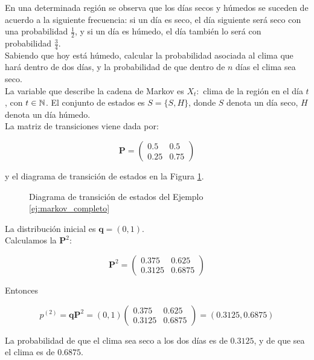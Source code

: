 \begin{ejemplo} \label{ej:markov_completo}

En una determinada región se observa que los días secos y húmedos se suceden de acuerdo a la siguiente frecuencia: si un día es seco, el día siguiente será seco con una probabilidad $\frac{1}{2}$, y si un día es húmedo, el día también lo será con probabilidad $\frac{3}{4}$.\\

Sabiendo que hoy está húmedo, calcular la probabilidad asociada al clima que hará dentro de dos días, y la probabilidad de que dentro de $n$ días el clima sea seco. \\

La variable que describe la cadena de Markov es $X_t:$ clima de la región en el día $t$, con $t \in \mathbb{N}$. El conjunto de estados es $S = \{S, H\}$, donde $S$ denota un día seco, $H$ denota un día húmedo.\\

La matriz de transiciones viene dada por:

\[ \mathbf{P} = \left( \begin{array}{cc}
0.5 & 0.5\\
0.25 & 0.75
\end{array} \right) \]

y el diagrama de transición de estados en la Figura \ref{fig:markov_completo}.

\begin{figure}[htb]
\centering
\ejemplomarkovcompleto
\caption{Diagrama de transición de estados del Ejemplo \ref{ej:markov_completo}}
\label{fig:markov_completo}
\end{figure} 

La distribución inicial es $\mathbf{q} = (0, 1)$.\\

Calculamos la $\mathbf{P}^2$:

\[ \mathbf{P}^2 = \left( \begin{array}{cc}
0.375 & 0.625\\
0.3125 & 0.6875
\end{array} \right) \]

Entonces

\[ p^{(2)} = \mathbf{q P}^2 = (0,1) \left( \begin{array}{cc}
0.375 & 0.625\\
0.3125 & 0.6875
\end{array} \right) = (0.3125, 0.6875) \]

La probabilidad de que el clima sea seco a los dos días es de $0.3125$, y de que sea el clima es de $0.6875$.\\


\end{ejemplo}
